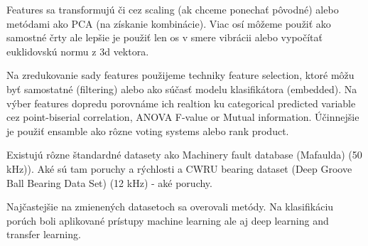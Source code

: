\documentclass{llncs}
\begin{document}
\cite{mostafavi_novel_2021}
\cite{moctar_time-domain_2023}
\cite{noauthor_iso_2016_2}
\cite{peeters_large_2004}


Features sa transformujú či cez scaling (ak chceme ponechať pôvodné) alebo metódami ako PCA (na získanie kombinácie). Viac osí môžeme použiť ako samostné črty ale lepšie je použiť len os v smere vibrácii alebo vypočítať euklidovskú normu z 3d vektora.
\cite{brito_fault_2021}
\cite{zheng_feature_2018}
\cite{kamminga_robust_2018} %

Na zredukovanie sady features použijeme techniky feature selection, ktoré môžu byť samostatné (filtering) alebo ako súčasť modelu klasifikátora (embedded). Na výber features dopredu porovnáme ich realtion ku categorical predicted variable cez point-biserial correlation, ANOVA F-value or Mutual information. Účinnejšie je použiť ensamble ako rôzne voting systems alebo rank product.
\cite{nandi_condition_2019}
\cite{breitling_rank_2004}


Existujú rôzne štandardné datasety ako Machinery fault database (Mafaulda) (50 kHz)). Aké sú tam poruchy a rýchlosti a CWRU bearing dataset (Deep Groove Ball Bearing Data Set) (12 kHz) - aké poruchy.
\cite{ribeiro_rotating_2017}



Najčastejšie na zmienených datasetoch sa overovali metódy. Na klasifikáciu porúch boli aplikované prístupy machine learning ale aj deep learning and transfer learning.


\cite{abu_alfeilat_effects_2019} %
\end{document}
